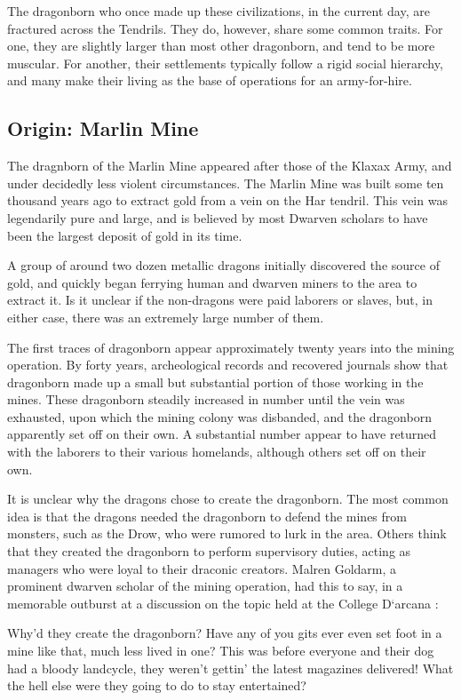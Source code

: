 The dragonborn who once made up these civilizations, in the current day, are fractured across the Tendrils.
They do, however, share some common traits.
For one, they are slightly larger than most other dragonborn, and tend to be more muscular.
For another, their settlements typically follow a rigid social hierarchy, and many make their living as the base of operations for an army-for-hire.

\subsection{Origin: Marlin Mine}
The dragnborn of the Marlin Mine appeared after those of the Klaxax Army, and under decidedly less violent circumstances.
The Marlin Mine was built some ten thousand years ago to extract gold from a vein on the Har tendril.
This vein was legendarily pure and large, and is believed by most Dwarven scholars to have been the largest deposit of gold in its time.

A group of around two dozen metallic dragons initially discovered the source of gold, and quickly began ferrying human and dwarven miners to the area to extract it.
Is it unclear if the non-dragons were paid laborers or slaves, but, in either case, there was an extremely large number of them.

The first traces of dragonborn appear approximately twenty years into the mining operation.
By forty years, archeological records and recovered journals show that dragonborn made up a small but substantial portion of those working in the mines.
These dragonborn steadily increased in number until the vein was exhausted, upon which the mining colony was disbanded, and the dragonborn apparently set off on their own.
A substantial number appear to have returned with the laborers to their various homelands, although others set off on their own.

It is unclear why the dragons chose to create the dragonborn.
The most common idea is that the dragons needed the dragonborn to defend the mines from monsters, such as the Drow, who were rumored to lurk in the area.
Others think that they created the dragonborn to perform supervisory duties, acting as managers who were loyal to their draconic creators.
Malren Goldarm, a prominent dwarven scholar of the mining operation, had this to say, in a memorable outburst at a discussion on the topic held at the College D`arcana :

\begin{itquote}
Why'd they create the dragonborn? Have any of you gits ever even set foot in a mine like that, much less lived in one? This was before everyone and their dog had a bloody landcycle, they weren't gettin' the latest magazines delivered! What the hell else were they going to do to stay entertained?
\end{itquote}

